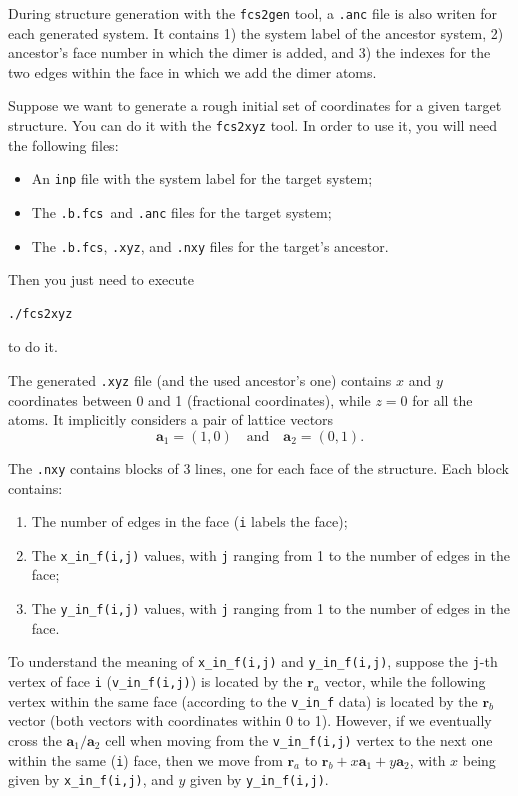 \documentclass{scrreprt}
\newcommand{\fcsb}{\texttt{.b.fcs}}
\begin{document}
During structure generation with the \verb-fcs2gen- tool, a \verb-.anc- file is also writen for each generated system. It contains 1) the system label of the ancestor system, 2) ancestor's face number in which the dimer is added, and 3) the indexes for the two edges within the face in which we add the dimer atoms.

Suppose we want to generate a rough initial set of coordinates for a given target structure. You can do it with the \verb-fcs2xyz- tool. In order to use it, you will need the following files:
\begin{itemize}
 \item An \verb-inp- file with the system label for the target system;
 \item The \fcsb~and \verb-.anc- files for the target system;
 \item The \fcsb, \verb-.xyz-, and \verb-.nxy- files for the target's ancestor.
\end{itemize}
Then you just need to execute
\begin{verbatim}
./fcs2xyz 
\end{verbatim}
to do it.

The generated \verb-.xyz- file (and the used ancestor's one) contains $x$ and $y$ coordinates between 0 and 1 (fractional coordinates), while $z=0$ for all the atoms. It implicitly considers a pair of lattice vectors
\begin{equation}
\mathbf{a}_1=(1,0)\quad\textrm{and}\quad\mathbf{a}_2=(0,1). 
\end{equation}

The \verb-.nxy- contains blocks of 3 lines, one for each face of the structure. Each block contains:
\begin{enumerate}
 \item The number of edges in the face (\verb-i- labels the face);
 \item The \verb-x_in_f(i,j)- values, with \verb-j- ranging from 1 to the number of edges in the face;
 \item The \verb-y_in_f(i,j)- values, with \verb-j- ranging from 1 to the number of edges in the face.
\end{enumerate}
To understand the meaning of \verb-x_in_f(i,j)- and \verb-y_in_f(i,j)-, suppose the \verb-j--th vertex of face \verb-i- (\verb-v_in_f(i,j)-) is located by the $\mathbf{r}_a$ vector, while the following vertex within the same face (according to the \verb-v_in_f- data) is located by the $\mathbf{r}_b$ vector (both vectors with coordinates within 0 to 1). However, if we eventually cross the $\mathbf{a}_1/\mathbf{a}_2$ cell when moving from the \verb-v_in_f(i,j)- vertex to the next one within the same (\verb-i-) face, then we move from $\mathbf{r}_a$ to $\mathbf{r}_b+x\mathbf{a}_1+y\mathbf{a}_2$, with $x$ being given by \verb-x_in_f(i,j)-, and $y$ given by \verb-y_in_f(i,j)-.
\end{document}
